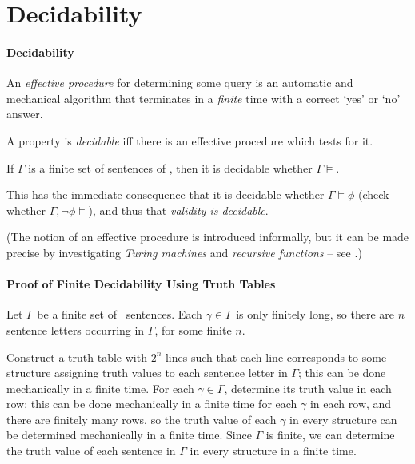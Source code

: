 \section{Decidability}
\paragraph{Decidability}

An \emph{effective procedure} for determining some query is an automatic and mechanical algorithm that terminates in a \emph{finite} time with a correct `yes' or `no' answer. 

A property is \emph{decidable} iff there is an effective procedure which tests for it.

\begin{theorem}
	If $\Gamma$ is a finite set of sentences of \lone, then it is decidable whether $\Gamma \vDash$.
\end{theorem}

This has the immediate consequence that it is decidable whether $\Gamma\vDash\phi$ (check whether $\Gamma,\neg\phi\vDash$), and thus that \emph{validity is decidable}.

(The notion of an effective procedure is introduced informally, but it can be made precise by investigating \emph{Turing machines} and  \emph{recursive functions} – see \citet[chs.\ 1--8]{bbjcomlo}.)

\paragraph{Proof of Finite Decidability Using Truth Tables}

Let $\Gamma$ be a finite set of \lone\ sentences. Each $\gamma\in\Gamma$ is only finitely long, so there are $n$ sentence letters occurring in $\Gamma$, for some finite $n$.

Construct a truth-table with $2^{n}$ lines such that each line corresponds to some structure assigning truth values to each sentence letter in $\Gamma$; this can be done mechanically in a finite time. For each $\gamma \in \Gamma$, determine its truth value in each row; this can be done mechanically in a finite time for each $\gamma$ in each row, and there are finitely many rows, so the truth value of each $\gamma$ in every structure can be determined mechanically in a finite time. Since $\Gamma$ is finite, we can determine the truth value of each sentence in $\Gamma$ in every structure in a finite time. 

